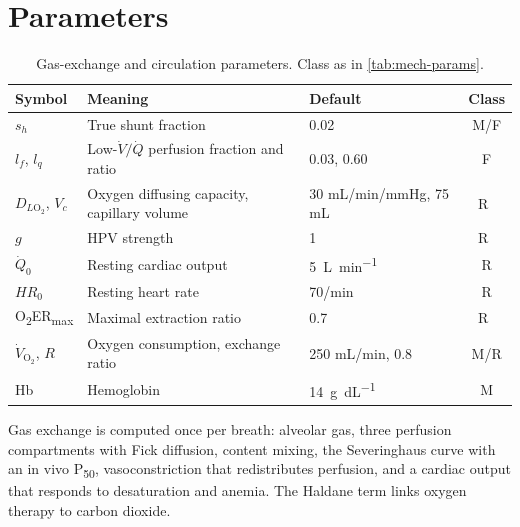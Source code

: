 \section{Parameters}
\begin{table}[ht]
\centering
\caption{Gas-exchange and circulation parameters. Class as in \cref{tab:mech-params}.}
\label{tab:gx-params}
\small
\begin{tabularx}{\linewidth}{@{}l X l c@{}}
\toprule
Symbol & Meaning & Default & Class \\
\midrule
$s_h$ & True shunt fraction & 0.02 & M/F \\
$l_f$, $l_q$ & Low-$\dot V/\dot Q$ perfusion fraction and ratio & 0.03, 0.60 & F \\
$D_{L\mathrm{O_2}}$, $V_c$ & Oxygen diffusing capacity, capillary volume & 30 mL/min/mmHg, 75 mL & R~\citep{roughton1957} \\
$g$ & HPV strength & 1 & R~\citep{marshall1980} \\
$\dot Q_0$ & Resting cardiac output & \SI{5}{\liter\per\minute} & R \\
$HR_0$ & Resting heart rate & 70/min & R \\
O\textsubscript{2}ER\textsubscript{max} & Maximal extraction ratio & 0.7 & R~\citep{schumacker1987} \\
$\dot V_{\mathrm{O_2}}$, $R$ & Oxygen consumption, exchange ratio & 250 mL/min, 0.8 & M/R \\
Hb & Hemoglobin & \SI{14}{\gram\per\deci\liter} & M \\
\bottomrule
\end{tabularx}
\end{table}

\begin{summarybox}
Gas exchange is computed once per breath: alveolar gas, three perfusion compartments with Fick diffusion, content mixing, the Severinghaus curve with an in vivo P\textsubscript{50}, vasoconstriction that redistributes perfusion, and a cardiac output that responds to desaturation and anemia. The Haldane term links oxygen therapy to carbon dioxide.
\end{summarybox}
